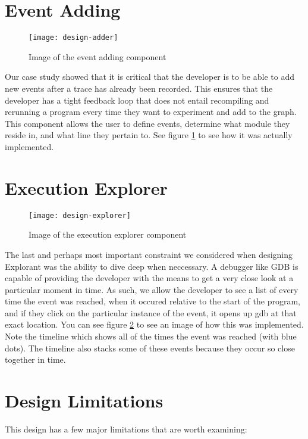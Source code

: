 \section{Event Adding}
\begin{figure}[!ht]
    \centering
    \texttt{[image: design-adder]}
    \caption{Image of the event adding component}
    \label{fig:graph-add}
\end{figure}
Our case study showed that it is critical that the developer is to be able to add new events after a trace has already been recorded. This ensures that the developer has a tight feedback loop that does not entail recompiling and rerunning a program every time they want to experiment and add to the graph. This component allows the user to define events, determine what module they reside in, and what line they pertain to. See figure \ref{fig:graph-add} to see how it was actually implemented. 


\section{Execution Explorer}
\begin{figure}[!ht]
    \centering
    \texttt{[image: design-explorer]}
    \caption{Image of the execution explorer component}
    \label{fig:graph-exp}
\end{figure}
The last and perhaps most important constraint we considered when designing Explorant was the ability to dive deep when neccessary. A debugger like GDB is capable of providing the developer with the means to get a very close look at a particular moment in time. As such, we allow the developer to see a list of every time the event was reached, when it occured relative to the start of the program, and if they click on the particular instance of the event, it opens up gdb at that exact location. You can see figure \ref{fig:graph-exp} to see an image of how this was implemented. Note the timeline which shows all of the times the event was reached (with blue dots). The timeline also stacks some of these events because they occur so close together in time. 

\section{Design Limitations}
\label{sec:design-limitations}

\noindent This design has a few major limitations that are worth examining:


